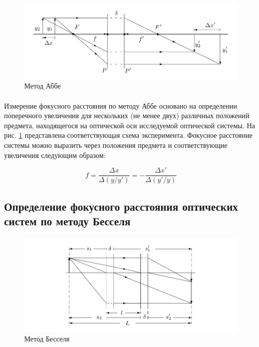 \documentclass[a4paper,12pt]{article} %
\begin{document}
\begin{figure}[h]
\centering
\includegraphics[width=\textwidth]{abbe.png}
\caption{Метод Аббе}
\label{fig:abbe}
\end{figure}

\paragraph{} Измерение фокусного расстояния по методу Аббе основано на определении поперечного увеличения для нескольких (не менее двух) различных положений предмета, находящегося на оптической оси исследуемой оптической системы. На рис. \ref{fig:abbe} представлена соответствующая схема эксперимента. Фокусное расстояние системы можно выразить через положения предмета и соответствующие увеличения следующим образом:

\begin{equation}
f = \frac{\Delta x}{\Delta(y/y')} = - \frac{\Delta x'}{\Delta(y'/y)}
\label{e:abbe}
\end{equation}

\subsection{Определение фокусного расстояния оптических систем по методу Бесселя}

\begin{figure}[h]
\centering
\includegraphics[width=\textwidth]{bessel.png}
\caption{Метод Бесселя}
\label{fig:bessel}
\end{figure}
\end{document}
